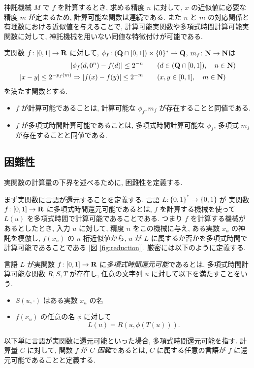  神託機械 $M$ で $f$ を計算するとき, 求める精度 $n$ に対して,
 $x$ の近似値に必要な精度 $m$ が定まるため,
 計算可能な関数は連続である.
 また $n$ と $m$ の対応関係と有理数における近似値を与えることで,
 計算可能実関数や多項式時間計算可能実関数に対して,
 神託機械を用いない同値な特徴付けが可能である.

 \begin{lemma}
  \label{lem:type1representation}
  実関数 $f\colon [0,1] \to \mathbf R$ に対して,
  $\phi_f\colon (\mathbf Q \cap [0, 1]) \times \{0\}^* \to \mathbf Q$, $m_f\colon \mathbf N \to \mathbf N$は
  \begin{align}
   |\phi_f(d, 0^n) - f(d)| \le 2^{-n} 
   &\qquad (d \in (\mathbf Q \cap [0,1]), \quad n \in \mathbf N)\\
   |x-y| \le 2^{-p_f(m)} \Rightarrow |f(x) - f(y)| \le 2^{-m}
   &\qquad (x, y \in [0, 1], \quad m \in \mathbf N)
  \end{align}
 を満たす関数とする.
  \begin{itemize}
   \item $f$ が計算可能であることは, 計算可能な $\phi_f, m_f$ が存在することと同値である. 
   \item $f$ が多項式時間計算可能であることは, 多項式時間計算可能な 
  $\phi_f$, 多項式 $m_f$ が存在することと同値である.
  \end{itemize} 
\end{lemma}



\subsection{困難性}

 実関数の計算量の下界を述べるために, 困難性を定義する.

 まず実関数に言語が還元することを定義する.
 言語 $L \colon \{0, 1\} ^* \to \{0, 1\}$ が
 実関数 $f\colon [0,1] \to \mathbf R$ に多項式時間還元可能であるとは,
 $f$ を計算する機械を使って $L(u)$ を多項式時間で計算可能であることである.
 つまり $f$ を計算する機械があるとしたとき, 入力 $u$ に対して,
 精度 $n$ をこの機械に与え, ある実数 $x_u$ の神託を模倣し, $f(x_u)$ の $n$ 桁近似値から,
 $u$ が $L$ に属するか否かを多項式時間で計算可能であることである
 [図 \ref{fig:reduction}].
 厳密には以下のように定義する.

 \begin{definition}[多項式時間還元可能]
  言語 $L$ が実関数 $f\colon [0,1] \to \mathbf R$ に\emph{多項式時間還元可能}であるとは, 
  多項式時間計算可能な関数 $R,S,T$ が存在し, 
  任意の文字列 $u$ に対して以下を満たすことをいう. 
  \begin{itemize}
   \item $S(u, \cdot)$ はある実数 $x_u$ の名
   \item $f(x_u)$ の任意の名 $\phi$ に対して
	 \[
	  L(u) = R(u, \phi(T(u))).
	 \]
  \end{itemize}
 \end{definition}
 以下単に言語が実関数に還元可能といった場合, 多項式時間還元可能を指す.
 計算量 $C$ に対して, 関数 $f$ が \emph{$C$ 困難}であるとは,
 $C$ に属する任意の言語が $f$ に還元可能であることと定義する.


